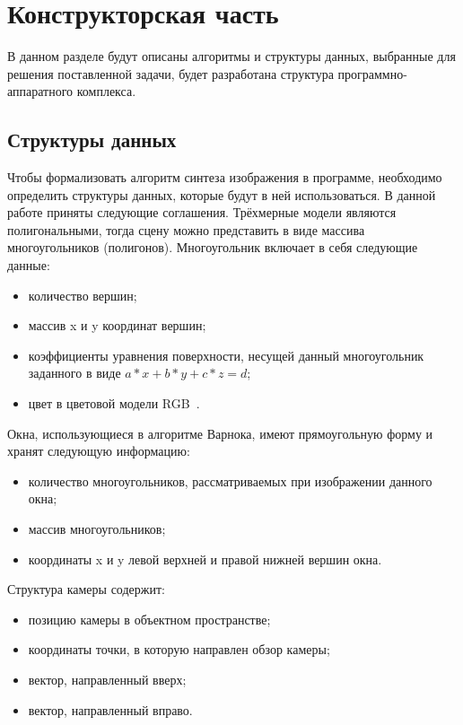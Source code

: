 \chapter{Конструкторская часть}

В данном разделе будут описаны алгоритмы и структуры данных, выбранные для
решения поставленной задачи, будет разработана структура программно-аппаратного комплекса. 

\section{Структуры данных}

Чтобы формализовать алгоритм синтеза изображения в программе, необходимо определить структуры данных, которые будут в ней использоваться. 
В данной работе приняты следующие соглашения. 
Трёхмерные модели являются полигональными, тогда сцену можно представить в виде массива многоугольников (полигонов). Многоугольник включает в себя следующие данные:

\begin{itemize}
    \item количество вершин;
    \item массив x и y координат вершин;
    \item коэффициенты уравнения поверхности, несущей данный многоугольник заданного в виде $a * x + b * y + c * z = d$;
    \item цвет в цветовой модели RGB~\cite{rgb}.
\end{itemize}

Окна, использующиеся в алгоритме Варнока, имеют прямоугольную форму и хранят следующую информацию:
\begin{itemize}
    \item количество многоугольников, рассматриваемых при изображении данного окна;
    \item массив многоугольников;
    \item координаты x и y левой верхней и правой нижней вершин окна. 
\end{itemize}

Структура камеры содержит:
\begin{itemize}
    \item позицию камеры в объектном пространстве;
    \item координаты точки, в которую направлен обзор камеры;
    \item вектор, направленный вверх;
    \item вектор, направленный вправо.
\end{itemize}

